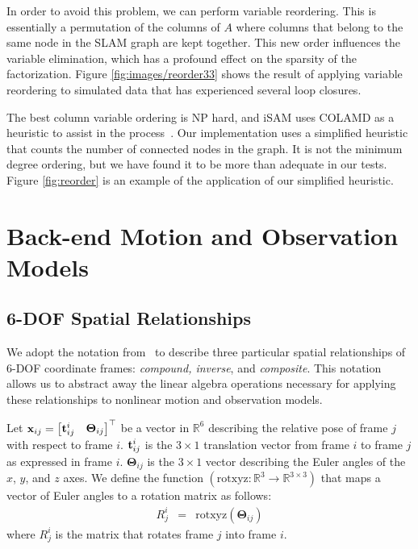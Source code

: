 \documentclass[conference]{IEEEtran}
\begin{document}
In order to avoid this problem, we can perform variable reordering. This is essentially a
permutation of the columns of $A$ where columns that belong to the same node in the \ac{SLAM}
graph are kept together. This new order influences the variable elimination, which
has a profound effect on the sparsity of the factorization. Figure
\ref{fig:images/reorder33} shows the result of applying variable reordering to simulated
data that has experienced several loop closures.

The best column variable ordering is NP hard, and iSAM uses COLAMD as a heuristic to
assist in the process~\cite{davis2004column}. Our implementation uses a simplified
heuristic that counts the number of connected nodes in the graph. It is not the minimum
degree ordering, but we have found it to be more than adequate in our tests. Figure
\ref{fig:reorder} is an example of the application of our simplified heuristic.

\section{Back-end Motion and Observation Models}
\label{sec:backendModels}

\subsection{6-\ac{DOF} Spatial Relationships}
\label{sec:6dof}

We adopt the notation from~\cite{rsmith-1990a,reustice-phdthesis} to
describe three particular spatial relationships of 6-\ac{DOF} coordinate
frames: {\it compound, inverse}, and {\it composite}.  This notation
allows us to abstract away the linear algebra operations necessary for
applying these relationships to nonlinear motion and observation models.

Let ${\bf x}_{ij} = \begin{bmatrix}
  {\bf t}_{ij}^i & {\boldsymbol \Theta}_{ij}\\
\end{bmatrix}^\top$ be a vector in $\mathbb{R}^6$ describing the
relative pose of frame $j$ with respect to frame $i$.  ${\bf
  t}_{ij}^i$ is the $3\times 1$ translation vector from frame $i$ to
frame $j$ as expressed in frame $i$.  ${\boldsymbol \Theta}_{ij}$ is
the $3 \times 1$ vector describing the Euler angles of the $x$, $y$,
and $z$ axes.  We define the function $(\text{rotxyz}: \mathbb{R}^3
\rightarrow \mathbb{R}^{3\times3})$ that maps a vector of Euler angles to
a rotation matrix as follows:
\begin{eqnarray*}
  R_j^i & = & \text{rotxyz}({\boldsymbol \Theta}_{ij})
\end{eqnarray*}
where $R_j^i$ is the matrix that rotates frame $j$ into frame $i$.
\end{document}

